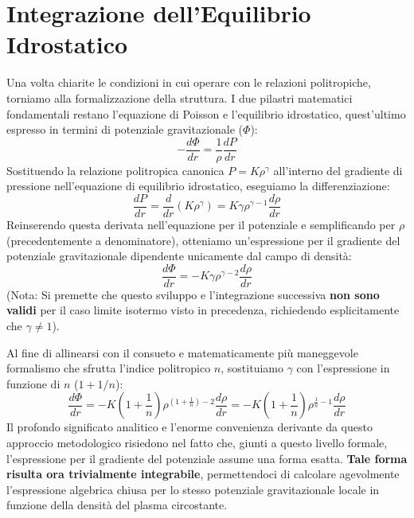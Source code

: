 \section{Integrazione dell'Equilibrio Idrostatico}

Una volta chiarite le condizioni in cui operare con le relazioni politropiche, torniamo alla formalizzazione della struttura. I due pilastri matematici fondamentali restano l'equazione di Poisson e l'equilibrio idrostatico, quest'ultimo espresso in termini di potenziale gravitazionale ($\Phi$):
\begin{equation}
-\frac{d\Phi}{dr} = \frac{1}{\rho} \frac{dP}{dr}
\end{equation}
Sostituendo la relazione politropica canonica $P = K \rho^\gamma$ all'interno del gradiente di pressione nell'equazione di equilibrio idrostatico, eseguiamo la differenziazione:
\begin{equation}
\frac{dP}{dr} = \frac{d}{dr} \left( K \rho^\gamma \right) = K \gamma \rho^{\gamma-1} \frac{d\rho}{dr}
\end{equation}
Reinserendo questa derivata nell'equazione per il potenziale e semplificando per $\rho$ (precedentemente a denominatore), otteniamo un'espressione per il gradiente del potenziale gravitazionale dipendente unicamente dal campo di densità:
\begin{equation}
\frac{d\Phi}{dr} = - K \gamma \rho^{\gamma-2} \frac{d\rho}{dr}
\end{equation}
(Nota: Si premette che questo sviluppo e l'integrazione successiva \textbf{non sono validi} per il caso limite isotermo visto in precedenza, richiedendo esplicitamente che \textbf{$\gamma \neq 1$}).

Al fine di allinearsi con il consueto e matematicamente più maneggevole formalismo che sfrutta l'indice politropico $n$, sostituiamo $\gamma$ con l'espressione in funzione di $n$ ($1 + 1/n$):
\begin{equation}
\frac{d\Phi}{dr} = - K \left( 1 + \frac{1}{n} \right) \rho^{\left(1 + \frac{1}{n}\right) - 2} \frac{d\rho}{dr} = - K \left( 1 + \frac{1}{n} \right) \rho^{\frac{1}{n} - 1} \frac{d\rho}{dr}
\end{equation}
Il profondo significato analitico e l'enorme convenienza derivante da questo approccio metodologico risiedono nel fatto che, giunti a questo livello formale, l'espressione per il gradiente del potenziale assume una forma esatta. \textbf{Tale forma risulta ora trivialmente integrabile}, permettendoci di calcolare agevolmente l'espressione algebrica chiusa per lo stesso potenziale gravitazionale locale in funzione della densità del plasma circostante.


